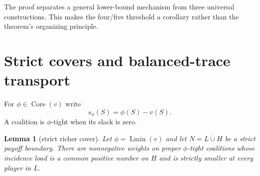\documentclass[11pt]{article}
\newtheorem{lemma}[theorem]{Lemma}
\newcommand{\core}{\operatorname{Core}}
\newcommand{\Lmin}{\operatorname{Lmin}}
\begin{document}
The proof separates a general lower-bound mechanism from three universal
constructions.  This makes the four/five threshold a corollary rather than
the theorem's organizing principle.

\section{Strict covers and balanced-trace transport}

For $\phi\in\core(v)$ write
\[
 s_\phi(S)=\phi(S)-v(S).
\]
A coalition is $\phi$-tight when its slack is zero.

\begin{lemma}[strict richer cover]\label{lem:cover}
Let $\phi=\Lmin(v)$ and let $N=L\mathbin{\dot\cup}H$ be a strict payoff
boundary.  There are nonnegative weights on proper $\phi$-tight coalitions
whose incidence load is a common positive number on $H$ and is strictly
smaller at every player in $L$.
\end{lemma}
\end{document}
